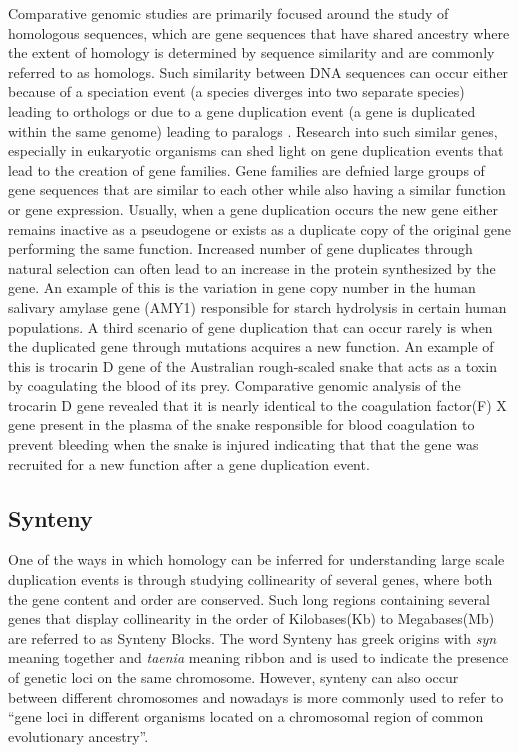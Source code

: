 Comparative genomic studies are primarily focused around the study of homologous sequences, which are gene sequences that have shared ancestry where the extent of homology is determined by sequence similarity and are commonly referred to as homologs. Such similarity between DNA sequences can occur either because of a speciation event (a species diverges into two separate species) leading to orthologs or due to a gene duplication event (a gene is duplicated within the same genome) leading to paralogs \cite{jensen2001orthologs}. Research into such similar genes, especially in eukaryotic organisms can shed light on gene duplication events that lead to the creation of gene families\cite{rubin2000comparative}. Gene families are defnied large groups of gene sequences that are similar to each other while also having a similar function or gene expression. Usually, when a gene duplication occurs the new gene either remains inactive as a pseudogene or exists as a duplicate copy of the original gene performing the same function. Increased number of gene duplicates through natural selection can often lead to an increase in the protein synthesized by the gene. An example of this is the variation in gene copy number in the human salivary amylase gene (AMY1) responsible for starch hydrolysis in certain human populations\cite{perry2007diet}. A third scenario of gene duplication that can occur rarely is when the duplicated gene through mutations acquires a new function. An example of this is trocarin D gene of the Australian rough-scaled snake that acts as a toxin by coagulating the blood of its prey. Comparative genomic analysis of the trocarin D gene revealed that it is nearly identical to the coagulation factor(F) X gene present in the plasma of the snake responsible for blood coagulation to prevent bleeding when the snake is injured indicating that that the gene was recruited for a new function after a gene duplication event\cite{reza2007structure}.

\subsection{Synteny}
One of the ways in which homology can be inferred for understanding large scale duplication events is through studying collinearity of several genes, where both the gene content and order are conserved\cite{proost2011adhore}. Such long regions containing several genes that display collinearity in the order of Kilobases(Kb) to Megabases(Mb) are referred to as Synteny Blocks\cite{zeng2008orthocluster}. The word Synteny has greek origins with \textit{syn} meaning together and \textit{taenia} meaning ribbon and is used to indicate the presence of genetic loci on the same chromosome\cite{renwick1971mapping}. However, synteny can also occur between different chromosomes and nowadays is more commonly used to refer to ``gene loci in different organisms located on a chromosomal region of common evolutionary ancestry''\cite{passarge1999incorrect}.

